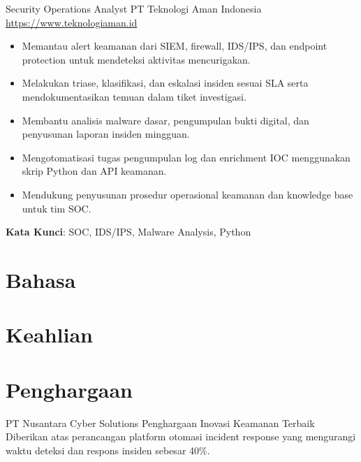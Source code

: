 \documentclass[a4paper, serif, 10pt]{moderncv}
\begin{document}
        {Security Operations Analyst}
        {PT Teknologi Aman Indonesia}
        {\url{https://www.teknologiaman.id}}
        {}
        {\begin{itemize}
\item Memantau alert keamanan dari SIEM, firewall, IDS/IPS, dan endpoint protection untuk mendeteksi aktivitas mencurigakan.
\item Melakukan triase, klasifikasi, dan eskalasi insiden sesuai SLA serta mendokumentasikan temuan dalam tiket investigasi.
\item Membantu analisis malware dasar, pengumpulan bukti digital, dan penyusunan laporan insiden mingguan.
\item Mengotomatisasi tugas pengumpulan log dan enrichment IOC menggunakan skrip Python dan API keamanan.
\item Mendukung penyusunan prosedur operasional keamanan dan knowledge base untuk tim SOC.
\end{itemize}
\textbf{Kata Kunci}: SOC, IDS/IPS, Malware Analysis, Python}
\section{Bahasa}

\section{Keahlian}

\section{Penghargaan}

        {PT Nusantara Cyber Solutions}
        {Penghargaan Inovasi Keamanan Terbaik}
        {}
        {}
        {Diberikan atas perancangan platform otomasi incident response yang mengurangi waktu deteksi dan respons insiden sebesar 40\%.}
\end{document}
